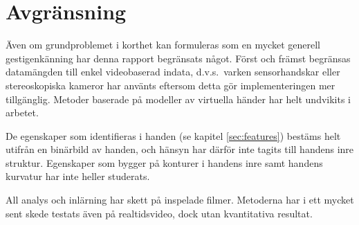 \documentclass[../rapport_MVEX01-11-05]{subfiles}
\begin{document}
\section{Avgränsning}
Även om grundproblemet i korthet kan formuleras som en mycket generell
gestigenkänning har denna rapport begränsats något. Först och främst
begränsas datamängden till enkel videobaserad indata, d.v.s.~varken sensorhandskar
eller stereoskopiska kameror har använts eftersom detta gör implementeringen mer
tillgänglig. Metoder baserade på modeller av virtuella händer har helt
undvikits i arbetet.

De egenskaper som identifieras i handen (se kapitel
\ref{sec:features}) bestäms helt utifrån en binärbild av
handen, och hänsyn har därför inte tagits till handens inre
struktur. Egenskaper som bygger på konturer i handens inre samt handens
kurvatur har inte heller studerats.

All analys och inlärning har skett på inspelade filmer. Metoderna har
i ett mycket sent skede testats även på realtidsvideo, dock utan
kvantitativa resultat.
\end{document}
